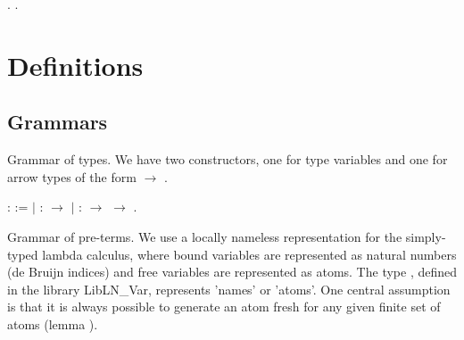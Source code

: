 \documentclass[12pt]{report}
\begin{document}

\begin{coqdoccode}
\coqdocemptyline
\coqdocnoindent
{}.\coqdoceol
\coqdocnoindent
{}  .\coqdoceol
\coqdocemptyline
\end{coqdoccode}
\section{Definitions}


\begin{coqdoccode}
\coqdocemptyline
\end{coqdoccode}
\subsection{Grammars}



 Grammar of types. We have two constructors, one for type variables
    and one for arrow types of the form  \ensuremath{\rightarrow} .

\begin{coqdoccode}
\coqdocemptyline
\coqdocnoindent
{}  :  :=\coqdoceol
\coqdocindent{1.00em}
\ensuremath{|}    :  \ensuremath{\rightarrow} \coqdoceol
\coqdocindent{1.00em}
\ensuremath{|}  :  \ensuremath{\rightarrow}  \ensuremath{\rightarrow} .\coqdoceol
\coqdocemptyline
\end{coqdoccode}
Grammar of pre-terms. We use a locally nameless representation for the
    simply-typed lambda calculus, where bound variables are represented as 
    natural numbers (de Bruijn indices) and free variables are represented as
    atoms. The type , defined in the library LibLN\_Var, represents
    'names' or 'atoms'. One central assumption is that it is always possible
    to generate an atom fresh for any given finite set of atoms (lemma 
    ). 
\end{document}
